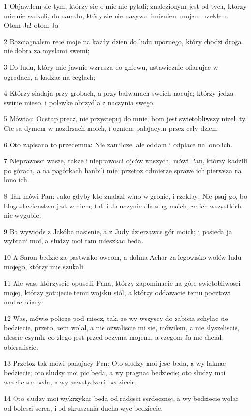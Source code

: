 \par 1 Objawilem sie tym, którzy sie o mie nie pytali; znalezionym jest od tych, którzy mie nie szukali; do narodu, który sie nie nazywal imieniem mojem. rzeklem: Otom Ja! otom Ja!
\par 2 Rozciagnalem rece moje na kazdy dzien do ludu upornego, który chodzi droga nie dobra za myslami swemi;
\par 3 Do ludu, który mie jawnie wzrusza do gniewu, ustawicznie ofiarujac w ogrodach, a kadzac na ceglach;
\par 4 Którzy siadaja przy grobach, a przy balwanach swoich nocuja; którzy jedza swinie mieso, i polewke obrzydla z naczynia swego.
\par 5 Mówiac: Odstap precz, nie przystepuj do mnie; bom jest swietobliwszy nizeli ty. Cic sa dymem w nozdrzach moich, i ogniem palajacym przez caly dzien.
\par 6 Oto zapisano to przedemna: Nie zamilcze, ale oddam i odplace na lono ich.
\par 7 Nieprawosci wasze, takze i nieprawosci ojców waszych, mówi Pan, którzy kadzili po górach, a na pagórkach hanbili mie; przetoz odmierze sprawe ich pierwsza na lono ich.
\par 8 Tak mówi Pan: Jako gdyby kto znalazl wino w gronie, i rzeklby: Nie psuj go, bo blogoslawienstwo jest w niem; tak i Ja uczynie dla slug moich, ze ich wszystkich nie wygubie.
\par 9 Bo wywiode z Jakóba nasienie, a z Judy dzierzawce gór moich; i posieda ja wybrani moi, a sludzy moi tam mieszkac beda.
\par 10 A Saron bedzie za pastwisko owcom, a dolina Achor za legowisko wolów ludu mojego, którzy mie szukali.
\par 11 Ale was, którzyscie opuscili Pana, którzy zapominacie na góre swietobliwosci mojej, którzy gotujecie temu wojsku stól, a którzy oddawacie temu pocztowi mokre ofiary:
\par 12 Was, mówie policze pod miecz, tak, ze wy wszyscy do zabicia schylac sie bedziecie, przeto, zem wolal, a nie ozwaliscie mi sie, mówilem, a nie slyszeliscie, alescie czynili, co zlego jest przed oczyma mojemi, a czegom Ja nie chcial, obieraliscie.
\par 13 Przetoz tak mówi panujacy Pan: Oto sludzy moi jesc beda, a wy laknac bedziecie; oto sludzy moi pic beda, a wy pragnac bedziecie; oto sludzy moi weselic sie beda, a wy zawstydzeni bedziecie.
\par 14 Oto sludzy moi wykrzykac beda od radosci serdecznej, a wy bedziecie wolac od bolesci serca, i od skruszenia ducha wyc bedziecie.
